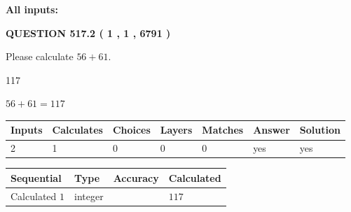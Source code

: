 \documentclass[12pt]{article}
\begin{document}
   
   
   
\noindent{}
   
   
   
   
\noindent\vspace{0.1in}\hspace{-0.08in} {\textbf{\Large{All inputs: }}}
   
   
  
\vspace{0.2in}
  
{\textbf{\Large{QUESTION
517.2 
 ( 1 , 1 , 6791 )
}}}
  
  
 
Please calculate $ %
56 +  %
61 $.
 
 
 
\noindent{}
 
 

117
 
 
\noindent{}
 
 

 
 
 
\noindent{}
 
 

$ %
56 +  %
61=   %
117$
 
 
\noindent{}
 
 

 
   
   
   
   
\noindent\begin{tabular}{|l|l|l|l|l|l|l|}
 \hline
Inputs & Calculates & Choices & Layers & Matches & Answer & Solution \\ \hline
 2  & 
 1  & 
 0
  & 
 0  & 
 0  & 
  yes & 
  yes 
  \\ \hline
 \end{tabular}
   
   
   
   
\noindent{}
   
   
  
  
\noindent\begin{tabular}{|l|l|l|l|}
\hline
 Sequential & Type & Accuracy & Calculated \\ 
\hline
 
 
  Calculated $  1 $ & integer &  & 
  $ 117 $ 
 \\  \hline  
 \end{tabular}
   
\end{document}
